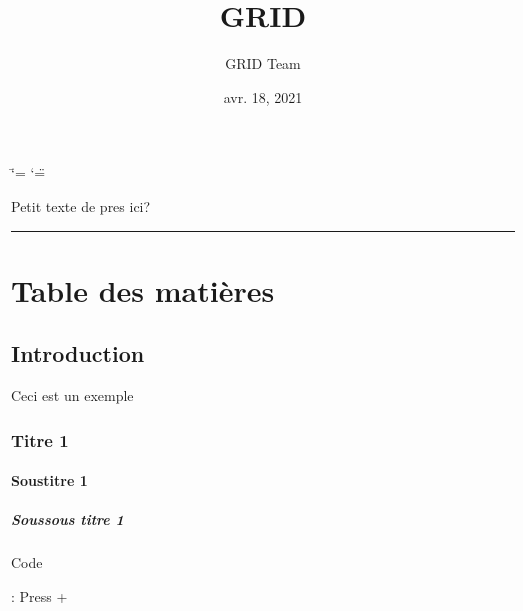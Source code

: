\documentclass[letterpaper,10pt,french]{sphinxmanual}
\title{GRID}
\date{avr. 18, 2021}
\author{GRID Team}
\begin{document}
\ifdefined\shorthandoff
  \ifnum\catcode`\=\string=\active\shorthandoff{=}\fi
  \ifnum\catcode`\"=\active{}\fi
\fi

\pagestyle{empty}
\sphinxmaketitle
\pagestyle{plain}
\sphinxtableofcontents
\pagestyle{normal}
\label{\detokenize{index::doc}}


\sphinxAtStartPar
Petit texte de pres ici?


\bigskip\hrule\bigskip



\chapter{Table des matières}
\label{\detokenize{index:table-des-matieres}}

\section{Introduction}
\label{\detokenize{intro:introduction}}\label{\detokenize{intro::doc}}
\sphinxAtStartPar
Ceci est un exemple


\subsection{Titre 1}
\label{\detokenize{intro:titre-1}}

\subsubsection{Sous\sphinxhyphen{}titre 1}
\label{\detokenize{intro:sous-titre-1}}

\paragraph{Sous\sphinxhyphen{}sous titre 1}
\label{\detokenize{intro:sous-sous-titre-1}}
\sphinxAtStartPar
Code

\begin{sphinxVerbatim}[commandchars=\\\{\}]
  
  
\end{sphinxVerbatim}

\sphinxAtStartPar
{} 

\sphinxAtStartPar
{}: Press  + 
\end{document}
